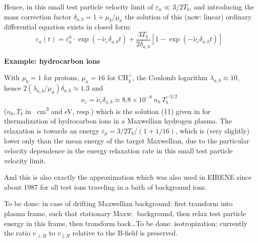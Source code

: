 Hence, in this small test particle velocity limit of $\varepsilon_a \ll
  3/2T_b$, and introducing the mass correction factor
$\delta_{a,b}=1+\mu_b/\mu_a$ the solution of this (now: linear) ordinary
differential equation exists in closed form:
\begin{equation}
  \label{eq.solut1}
  \varepsilon_a(t)=\varepsilon_a^0 \cdot
  \exp(-\tilde{\nu}_\varepsilon\delta_{a,b}  t)+
  \frac{3T_b}{2\delta_{a,b}}\left[1-\exp(-\tilde{\nu}_\varepsilon
    \delta_{a,b}t)\right]
\end{equation}

\textbf{Example: hydrocarbon ions \cite{kn:Langer}} 

With $\mu_b=1$ for protons, $\mu_a=16$ for CH$_4^+$, the Coulomb logarithm
$\lambda_{a,b} \approx 10$, hence $2 (\lambda_{a,b} / \mu_a) \delta_{a,b}
  \approx 1.3$ and
\begin{equation} {\nu}_\varepsilon = \tilde{\nu}_\varepsilon
  \delta_{a,b}\approx 8.8 \times 10^{-8}~ n_b~T_b^{-3/2} \nonumber
\end{equation}
($n_b, T_b$ in \si{\per\cubic\centi\metre} and \si{\electronvolt}, resp.) which
is the solution (11) given in \cite{kn:Langer} for thermalization of 
hydrocarbon ions in a Maxwellian hydrogen plasma.
The relaxation is towards an energy $\varepsilon_p = 3/2 T_b/(1+1/16)$, which
is (very slightly) lower only than the mean energy of the target Maxwellian,
due to the particular velocity dependence in the energy relaxation rate in this
small test particle velocity limit.

And this is also exactly the approximation which was also used in EIRENE since
about 1987 for all test ions traveling in a bath of background ions.

\textcolor[rgb]{1.00,0.00,0.00}{To be done: in case of drifting Maxwellian 
background: first transform into plasma frame, such that stationary Maxw.\ 
background, then relax test particle energy in this frame, then transform 
back\dots To be done: isotropization: currently the ratio $v_{\perp B}$ to 
$v_{\parallel B}$ relative to the B-field is preserved.}

